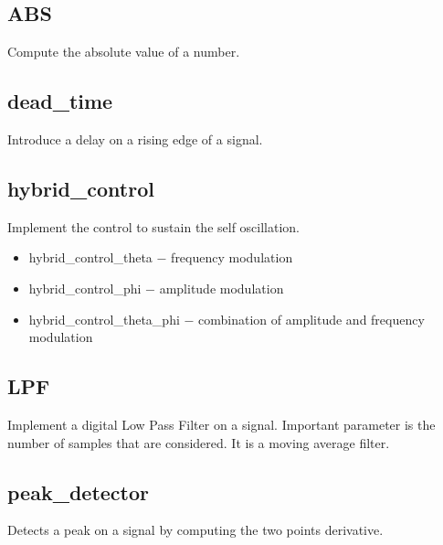 \documentclass[a4paper,10pt,twoside]{article}
\newcommand{\0}{\textbf{0}}
\newcommand{\1}{\textbf{1}}
\newcommand{\code}[1]{{\color{Mulberry}\textbf{\texttt{#1}}}}
\begin{document}



    \subsection{ABS}
        Compute the absolute value of a number.

    \subsection{dead\_time}
        Introduce a delay on a rising edge of a signal.

    \subsection{hybrid\_control}
        Implement the control to sustain the self oscillation.

        \begin{itemize}
            \item hybrid\_control\_theta $-$ frequency modulation 
            \item hybrid\_control\_phi  $-$ amplitude modulation
            \item hybrid\_control\_theta\_phi $-$ combination of amplitude and frequency modulation
        \end{itemize}

    \subsection{LPF}
        Implement a digital Low Pass Filter on a signal. Important parameter is the number of samples that are considered. It is a moving average filter.

    \subsection{peak\_detector}
        Detects a peak on a signal by computing the two points derivative.
\end{document}
